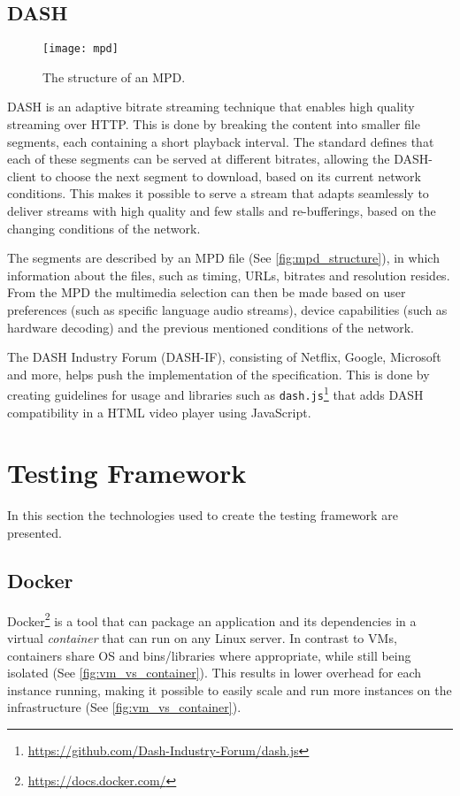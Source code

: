 \subsection{\acl{DASH}}
\label{sec:rel-dash}

\begin{figure}
    \texttt{[image: mpd]}
    \caption[Structure of an \acl{MPD}.]{The structure of an \acs{MPD}.}
    \label{fig:mpd_structure}
\end{figure}

\ac{DASH} is an adaptive bitrate streaming technique that enables high quality streaming over \ac{HTTP}. This is done by breaking the content into smaller file segments, each containing a short playback interval. The standard defines that each of these segments can be served at different bitrates, allowing the \ac{DASH}-client to choose the next segment to download, based on its current network conditions.
This makes it possible to serve a stream that adapts seamlessly to deliver streams with high quality and few stalls and re-bufferings, based on the changing conditions of the network.

The segments are described by an \ac{MPD} file (See \autoref{fig:mpd_structure}), in which information about the files, such as timing, \acp{URL}, bitrates and resolution resides. From the \ac{MPD} the multimedia selection can then be made based on user preferences (such as specific language audio streams), device capabilities (such as hardware decoding) and the previous mentioned conditions of the network.

The \ac{DASH} Industry Forum (DASH-IF), consisting of Netflix, Google, Microsoft and more, helps push the implementation of the specification\cite{ISO23009}. This is done by creating guidelines for usage and libraries such as \texttt{dash.js}\footnote{\url{https://github.com/Dash-Industry-Forum/dash.js}} that adds \ac{DASH} compatibility in a \ac{HTML} video player using JavaScript.

\section{Testing Framework}
In this section the technologies used to create the testing framework are presented.

\subsection{Docker}
 Docker\footnote{\url{https://docs.docker.com/}} is a tool that can package an application and its dependencies in a virtual \emph{container} that can run on any Linux server. In contrast to \acp{VM}, containers share \ac{OS} and bins/libraries where appropriate, while still being isolated (See \autoref{fig:vm_vs_container}). This results in lower overhead for each instance running, making it possible to easily scale and run more instances on the infrastructure (See \autoref{fig:vm_vs_container}).
 
